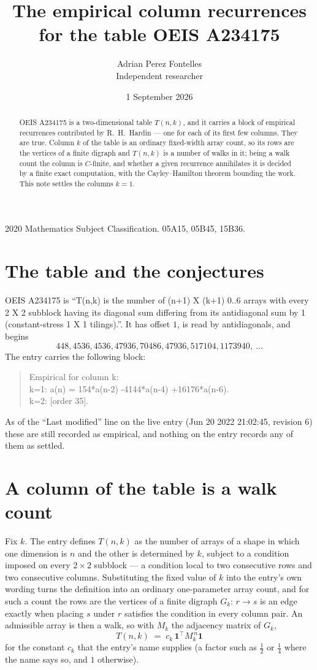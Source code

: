 \documentclass[11pt,a4paper]{article}
\title{The empirical column recurrences for the table OEIS A234175}
\author{Adrian Perez Fontelles\\ \small Independent researcher}
\date{1 September 2026}
\theoremstyle{plain}
\theoremstyle{definition}
\begin{document}
\maketitle

\begin{abstract}
OEIS A234175 is a two-dimensional table $T(n,k)$, and it carries a block of empirical
recurrences contributed by R.~H.~Hardin --- one for each of its first few columns. They are
true. Column $k$ of the table is an ordinary fixed-width array count, so its rows are the
vertices of a finite digraph and $T(n,k)$ is a number of walks in it; being a walk count the
column is $C$-finite, and whether a given recurrence annihilates it is decided by a finite
exact computation, with the Cayley--Hamilton theorem bounding the work. This note settles the columns $k=1$.
\end{abstract}

\noindent\small 2020 Mathematics Subject Classification. 05A15, 05B45, 15B36.\normalsize

\section{The table and the conjectures}

OEIS A234175 is ``T(n,k) is the number of (n+1) X (k+1) 0..6 arrays with every 2 X 2 subblock having its diagonal sum differing from its antidiagonal sum by 1 (constant-stress 1 X 1 tilings).''. It has offset $1$, is
read by antidiagonals, and begins
\[
448, 4536, 4536, 47936, 70486, 47936, 517104, 1173940,\ \dots
\]
The entry carries the following block:
\begin{quote}\small
Empirical for column k:\\
k=1: a(n) = 154*a(n-2) -4144*a(n-4) +16176*a(n-6).\\
k=2: [order 35].\\
\end{quote}
As of the ``Last modified'' line on the live entry (Jun 20 2022 21:02:45, revision 6) these are still
recorded as empirical, and nothing on the entry records any of them as settled.

\section{A column of the table is a walk count}

Fix $k$. The entry defines $T(n,k)$ as the number of arrays of a shape in which one dimension
is $n$ and the other is determined by $k$, subject to a condition imposed on every
$2\times2$ subblock --- a condition local to two consecutive rows and two consecutive columns.
Substituting the fixed value of $k$ into the entry's own wording turns the definition into an
ordinary one-parameter array count, and for such a count the rows are the vertices of a finite
digraph $G_k$: $r\to s$ is an edge exactly when placing $s$ under $r$ satisfies the condition
in every column pair. An admissible array is then a walk, so with $M_k$ the adjacency matrix
of $G_k$,
\[
T(n,k)\;=\;c_k\,\mathbf{1}^{\!\top}M_k^{\,n}\mathbf{1}
\]
for the constant $c_k$ that the entry's name supplies (a factor such as $\tfrac12$ or
$\tfrac14$ where the name says so, and $1$ otherwise).
\end{document}
